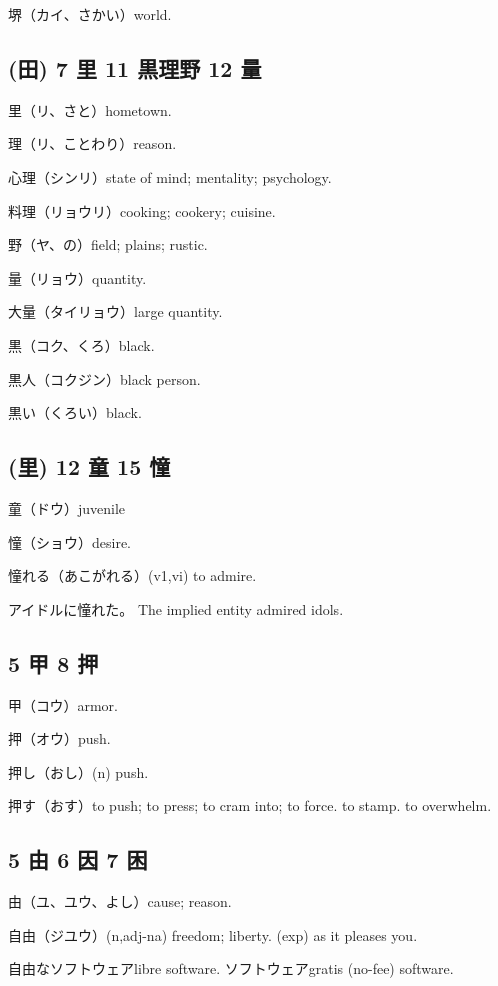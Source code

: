 堺（カイ、さかい）world.

\subsection{(田) 7 里 11 黒理野 12 量}

里（リ、さと）hometown.

理（リ、ことわり）reason.

心理（シンリ）state of mind; mentality; psychology.

料理（リョウリ）cooking; cookery; cuisine.

野（ヤ、の）field; plains; rustic.

量（リョウ）quantity.

大量（タイリョウ）large quantity.

黒（コク、くろ）black.

黒人（コクジン）black person.

黒い（くろい）black.

\subsection{(里) 12 童 15 憧}

童（ドウ）juvenile

憧（ショウ）desire.

憧れる（あこがれる）(v1,vi) to admire.

アイドルに憧れた。
The implied entity admired idols.

\subsection{5 甲 8 押}

甲（コウ）armor.

押（オウ）push.

押し（おし）(n) push.

押す（おす）to push; to press; to cram into; to force.
to stamp.
to overwhelm.

\subsection{5 由 6 因 7 困}

由（ユ、ユウ、よし）cause; reason.

自由（ジユウ）(n,adj-na) freedom; liberty.
(exp) as it pleases you.

自由なソフトウェアlibre software.
ソフトウェアgratis (no-fee) software.

